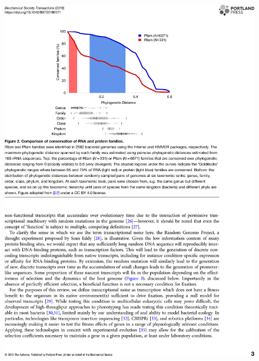 \begin{figure}
    \centering
    \includegraphics[width=\linewidth]{lit_review/page3.png}
\end{figure}
